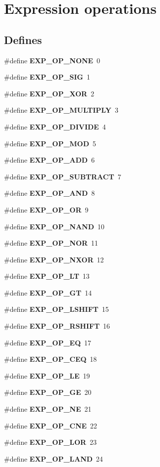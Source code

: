 \section{Expression operations}
\label{group__expr__ops}
\subsection*{Defines}
\begin{CompactItemize}
\item 
\#define {\bf EXP\_\-OP\_\-NONE}\ 0
\item 
\#define {\bf EXP\_\-OP\_\-SIG}\ 1
\item 
\#define {\bf EXP\_\-OP\_\-XOR}\ 2
\item 
\#define {\bf EXP\_\-OP\_\-MULTIPLY}\ 3
\item 
\#define {\bf EXP\_\-OP\_\-DIVIDE}\ 4
\item 
\#define {\bf EXP\_\-OP\_\-MOD}\ 5
\item 
\#define {\bf EXP\_\-OP\_\-ADD}\ 6
\item 
\#define {\bf EXP\_\-OP\_\-SUBTRACT}\ 7
\item 
\#define {\bf EXP\_\-OP\_\-AND}\ 8
\item 
\#define {\bf EXP\_\-OP\_\-OR}\ 9
\item 
\#define {\bf EXP\_\-OP\_\-NAND}\ 10
\item 
\#define {\bf EXP\_\-OP\_\-NOR}\ 11
\item 
\#define {\bf EXP\_\-OP\_\-NXOR}\ 12
\item 
\#define {\bf EXP\_\-OP\_\-LT}\ 13
\item 
\#define {\bf EXP\_\-OP\_\-GT}\ 14
\item 
\#define {\bf EXP\_\-OP\_\-LSHIFT}\ 15
\item 
\#define {\bf EXP\_\-OP\_\-RSHIFT}\ 16
\item 
\#define {\bf EXP\_\-OP\_\-EQ}\ 17
\item 
\#define {\bf EXP\_\-OP\_\-CEQ}\ 18
\item 
\#define {\bf EXP\_\-OP\_\-LE}\ 19
\item 
\#define {\bf EXP\_\-OP\_\-GE}\ 20
\item 
\#define {\bf EXP\_\-OP\_\-NE}\ 21
\item 
\#define {\bf EXP\_\-OP\_\-CNE}\ 22
\item 
\#define {\bf EXP\_\-OP\_\-LOR}\ 23
\item 
\#define {\bf EXP\_\-OP\_\-LAND}\ 24
\item 

\end{CompactItemize}
